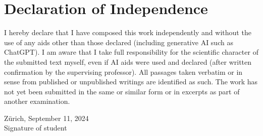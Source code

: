 \chapter*{Declaration of Independence}
I hereby declare that I have composed this work independently and without the use of any aids other than those declared (including generative AI such as ChatGPT). I am aware that I take full responsibility for the scientific character of the submitted text myself, even if AI aids were used and declared (after written confirmation by the supervising professor). All passages taken verbatim or in sense from published or unpublished writings are identified as such. The work has not yet been submitted in the same or similar form or in excerpts as part of another examination.

\vspace{2cm}

Z{\"u}rich, September 11, 2024 \hspace{3cm} \hrulefill \\
\hspace*{8.1cm} Signature of student